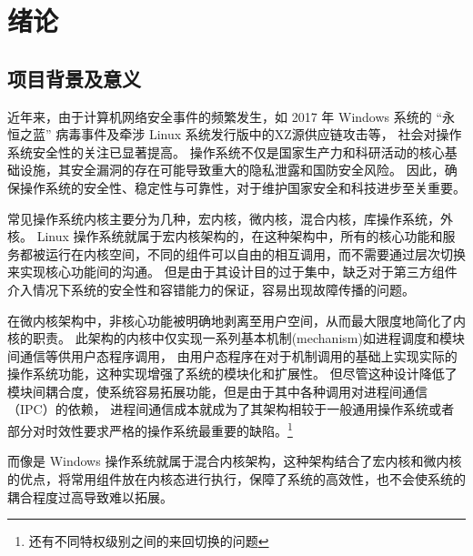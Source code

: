 \section{绪论}

\subsection{项目背景及意义}


    近年来，由于计算机网络安全事件的频繁发生，如 2017 年 Windows 系统的 “永恒之蓝” 病毒事件及牵涉 Linux 系统发行版中的XZ源供应链攻击等，
    社会对操作系统安全性的关注已显著提高。
    操作系统不仅是国家生产力和科研活动的核心基础设施，其安全漏洞的存在可能导致重大的隐私泄露和国防安全风险。
    因此，确保操作系统的安全性、稳定性与可靠性，对于维护国家安全和科技进步至关重要。


    常见操作系统内核主要分为几种，宏内核，微内核，混合内核，库操作系统，外核。
    Linux 操作系统就属于宏内核架构的，在这种架构中，所有的核心功能和服务都被运行在内核空间，不同的组件可以自由的相互调用，而不需要通过层次切换来实现核心功能间的沟通。
    但是由于其设计目的过于集中，缺乏对于第三方组件介入情况下系统的安全性和容错能力的保证，容易出现故障传播的问题。
    \cite{singh_microkernel_nodate}


    在微内核架构中，非核心功能被明确地剥离至用户空间，从而最大限度地简化了内核的职责。
    此架构的内核中仅实现一系列基本机制(mechanism)如进程调度和模块间通信等供用户态程序调用，
    由用户态程序在对于机制调用的基础上实现实际的操作系统功能，这种实现增强了系统的模块化和扩展性。
    \cite{hansen_nucleus_1970}
    但尽管这种设计降低了模块间耦合度，使系统容易拓展功能，但是由于其中各种调用对进程间通信（IPC）的依赖，
    进程间通信成本就成为了其架构相较于一般通用操作系统或者部分对时效性要求严格的操作系统最重要的缺陷。\footnote{还有不同特权级别之间的来回切换的问题}

    而像是 Windows 操作系统就属于混合内核架构，这种架构结合了宏内核和微内核的优点，将常用组件放在内核态进行执行，保障了系统的高效性，也不会使系统的耦合程度过高导致难以拓展。

